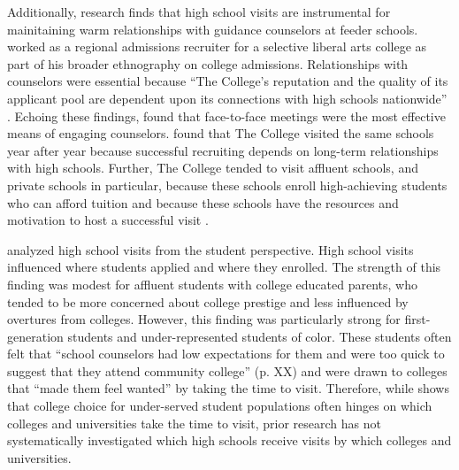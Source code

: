 \documentclass[twoside]{article}
\begin{document}
Additionally, research finds that high school visits are instrumental for mainitaining warm relationships with guidance counselors at feeder schools.  \cite{RN3519} worked as a regional admissions recruiter for a selective liberal arts college as part of his broader ethnography on college admissions.  Relationships with counselors were essential because ``The College's reputation and the quality of its applicant pool are dependent upon its connections with high schools nationwide'' \citep[p.~53]{RN3519}. Echoing these findings, \cite{RN4402} found that face-to-face meetings were the most effective means of engaging counselors.  \cite{RN3519} found that The College visited the same schools year after year because successful recruiting depends on long-term relationships with high schools. Further, The College tended to visit affluent schools, and private schools in particular, because these schools enroll high-achieving students who can afford tuition and because these schools have the resources and motivation to host a successful visit \citep{RN3519}.  


\cite{RN4324} analyzed high school visits from the student perspective. High school visits influenced where students applied and where they enrolled. The strength of this finding was modest for affluent students with college educated parents, who tended to be more concerned about college prestige and less influenced by overtures from colleges. However, this finding was particularly strong for first-generation students and under-represented students of color.  These students often felt that ``school counselors had low expectations for them and were too quick to suggest that they attend community college'' (p. XX) and were drawn to colleges that ``made them feel wanted'' by taking the time to visit.  Therefore, while \cite{RN4324} shows that college choice for under-served student populations often hinges on which colleges and universities take the time to visit, prior research has not systematically investigated which high schools receive visits by which colleges and universities.
\end{document}
